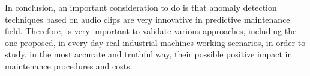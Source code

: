 In conclusion, an important consideration to do is that anomaly detection techniques based on audio clips are very innovative in predictive maintenance field. Therefore, is very important to validate various approaches, including the one proposed, in every day real industrial machines working scenarios, in order to study, in the most accurate and truthful way, their possible positive impact in maintenance procedures and costs.